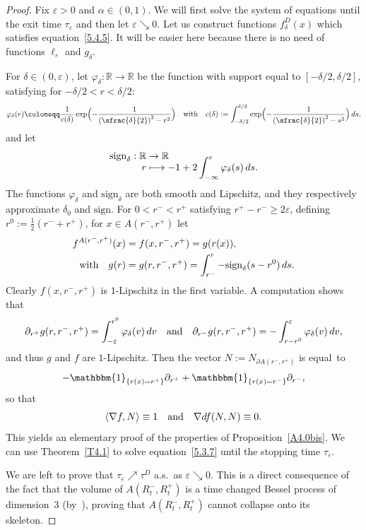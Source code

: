 \documentclass[JEP,XML,SOM,Unicode,NoFloatCountersInSection,published]{cedram}
\newcommand\mto{\mathchoice{\longmapsto}{\mapsto}{\mapsto}{\mapsto}}
\theoremstyle{plain}
\theoremstyle{definition}
\newcommand{\RR}{{\mathbb R}}
\newcommand\df{\coloneqq}
\newcommand{\sign}{\mathrm{sign}}
\newcommand{\un}{\mathbbm{1}}
\let\di\displaystyle
\let\f\frac
\let\a\alpha
\let\d\delta
\let\e\varepsilon
\let\n\nabla
\begin{document}
\begin{proof}
Fix $\e>0$ and $\a\in (0,1)$. We will first solve the system of equations until the exit time $\tau_\e$ and then let $\e\searrow 0$. Let us construct functions $f_\d^D(x)$ which satisfies equation~\eqref{5.4.5}. It will be easier here because there is no need of functions $\ell_\e$ and $g_\d$.

For $\d\in (0,\e)$, let $\varphi_\d:\RR\to \RR$ be the function with support equal to $[-\d/2,\d/2]$, satisfying for $-\d/2<r<\d/2$:
\begin{equation}
\varphi_\d (r)\df \f1{c(\d)}\exp\Bigl(-\f1{\left(\sfrac{\d}{2}\right)^2-r^2}\Bigr)\quad \hbox{with}\quad c(\d):=\int_{-\d/2}^{\d/2}\exp\Bigl(-\f1{\left(\sfrac{\d}{2}\right)^2-s^2}\Bigr)\,ds,
\end{equation}
and let
\begin{equation}
\begin{split}
\sign_\d: \RR&\to\RR\\[-10pt]
r&\mto -1+2\int_{-\infty}^r\varphi_\d(s)\,ds.
\end{split}
\end{equation}
The functions $\varphi_\d$ and $\sign_\d$ are both smooth and Lipschitz, and they respectively approximate $\d_0$ and $\sign$. For $0<r^-<r^+$ satisfying $r^+-r^-\ge 2\e$, defining \hbox{$\di r^0:=\tfrac12(r^-+r^+)$}, for $x\in A(r^-,r^+)$ let
\begin{equation}
\begin{split}
f^{A(r^-,r^+)}(x)&=f(x,r^-,r^+)=g(r(x)),\\
\hbox{with}\quad g(r)&=g(r,r^-,r^+)=\int_{r^-}^{r} -\sign_\d(s-r^0)\, ds.
\end{split}
\end{equation}
Clearly $f(x,r^-, r^+)$ is $1$-Lipschitz in the first variable. A computation shows that
\begin{equation}
\partial_{r^+}g(r,r^-,r^+)=\int_{-\e}^{r^0}\varphi_\d(v)\,dv\quad \hbox{and}\quad \partial_{r^-}g(r,r^-,r^+)=-\int_{r-r^0}^{\e}\varphi_\d(v)\,dv,
\end{equation}
and thus $g$ and $f$ are $1$-Lipschitz. Then the vector $N:=N_{\partial A(r^-,r^+)}$ is equal~to
\[
-\un_{\{r(x)=r^+\}}\partial_{r^+}+\un_{\{r(x)=r^-\}}\partial_{r^-},
\]
so that
\begin{equation}
\langle \n f, N\rangle \equiv 1\quad \hbox{and}\quad \n df(N,N)\equiv 0.
\end{equation}
This yields an elementary proof of the properties of Proposition~\ref{A4.0bis}. We can use Theorem~\ref{T4.1} to solve equation~\eqref{5.3.7} until the stopping time $\tau_\e$.

We are left to prove that $\tau_\e\nearrow \tau^D$ a.s.\ as $\e\searrow 0$. This is a direct consequence of the fact that the volume of $A(R_t^-,R_t^+)$ is a time changed Bessel process of dimension~$3$ (by~\cite[Th.\,5]{zbMATH07470497}), proving that $A(R_t^-,R_t^+)$ cannot collapse onto its skeleton.
\end{proof}
\end{document}
